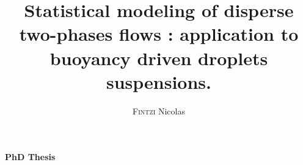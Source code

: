 \makeatletter
\begin{titlepage}

\begin{table}[h!]
\begin{minipage}[h]{0.5\linewidth}
\end{minipage}
\hspace{1cm}
\begin{minipage}[h]{0.5\linewidth}
\end{minipage}
\end{table}

\vfill

\begin{center}
{\Large\textbf{PhD Thesis}}\\

\vspace{3em}
\vspace{10pt}
\title{Statistical modeling of disperse two-phases flows : application to buoyancy driven droplets suspensions.}
{\huge\textbf{\@title}} \\
\vspace{10pt}


\vspace{2em}
\author{\textsc{Fintzi} Nicolas}
{\LARGE \@author}

\vspace{3em}
{\large\textbf{\@date}}\\
\end{center}


\vfill


\vspace{1em}


\end{titlepage}
